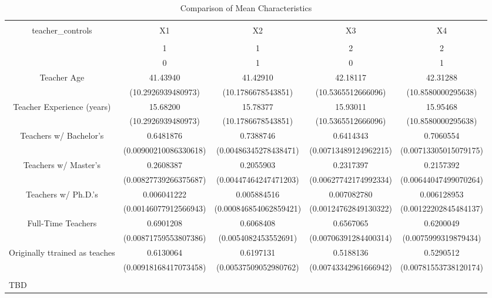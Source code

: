 
\begin{table}[!htbp] \centering 
  \caption{Comparison of Mean Characteristics} 
  \label{Tab1} 
\scriptsize 
\begin{tabular}{@{\extracolsep{5pt}} ccccc} 
\\[-1.8ex]\hline 
\hline \\[-1.8ex] 
teacher\_controls & X1 & X2 & X3 & X4 \\ 
\hline \\[-1.8ex] 
 & 1 & 1 & 2 & 2 \\ 
 & 0 & 1 & 0 & 1 \\ 
Teacher Age & 41.43940 & 41.42910 & 42.18117 & 42.31288 \\ 
 & (10.2926939480973) & (10.1786678543851) & (10.5365512666096) & (10.8580000295638) \\ 
Teacher Experience (years) & 15.68200 & 15.78377 & 15.93011 & 15.95468 \\ 
 & (10.2926939480973) & (10.1786678543851) & (10.5365512666096) & (10.8580000295638) \\ 
Teachers w/ Bachelor's & 0.6481876 & 0.7388746 & 0.6414343 & 0.7060554 \\ 
 & (0.00900210086330618) & (0.00486345278438471) & (0.00713489124962215) & (0.00713305015079175) \\ 
Teachers w/ Master's & 0.2608387 & 0.2055903 & 0.2317397 & 0.2157392 \\ 
 & (0.00827739266375687) & (0.00447464247471203) & (0.00627742174992334) & (0.00644047499070264) \\ 
Teachers w/ Ph.D.'s & 0.006041222 & 0.005884516 & 0.007082780 & 0.006128953 \\ 
 & (0.00146077912566943) & (0.000846854062859421) & (0.00124762849130322) & (0.00122202845484137) \\ 
Full-Time Teachers & 0.6901208 & 0.6068408 & 0.6567065 & 0.6200049 \\ 
 & (0.00871759553807386) & (0.0054082453552691) & (0.00706391284400314) & (0.0075999319879434) \\ 
Originally ttrained as teaches & 0.6130064 & 0.6197131 & 0.5188136 & 0.5290512 \\ 
 & (0.00918168417073458) & (0.00537509052980762) & (0.00743342961666942) & (0.00781553738120174) \\ 
\hline \\[-1.8ex] 
\multicolumn{5}{l}{TBD} \\ 
\end{tabular} 
\end{table} 
